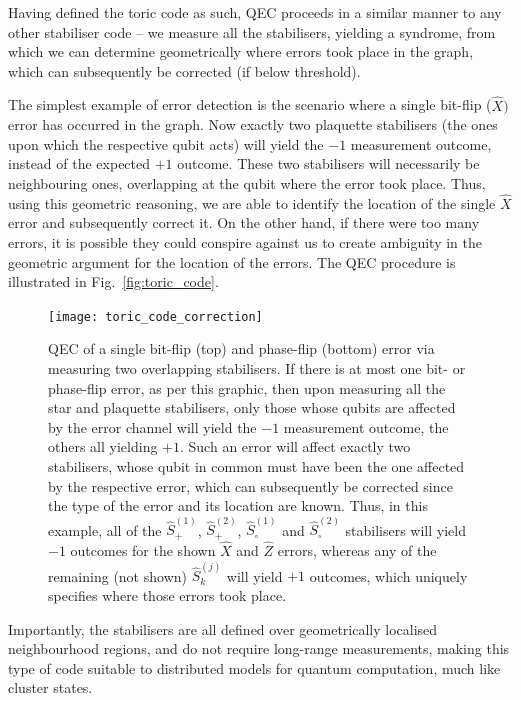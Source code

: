 Having defined the toric code as such, QEC proceeds in a similar manner to any other stabiliser code -- we measure all the stabilisers, yielding a syndrome, from which we can determine geometrically where errors took place in the graph, which can subsequently be corrected (if below threshold).

The simplest example of error detection is the scenario where a single bit-flip ($\hat{X})$ error has occurred in the graph. Now exactly two plaquette stabilisers (the ones upon which the respective qubit acts) will yield the $-1$ measurement outcome, instead of the expected $+1$ outcome. These two stabilisers will necessarily be neighbouring ones, overlapping at the qubit where the error took place. Thus, using this geometric reasoning, we are able to identify the location of the single $\hat{X}$ error and subsequently correct it. On the other hand, if there were too many errors, it is possible they could conspire against us to create ambiguity in the geometric argument for the location of the errors. The QEC procedure is illustrated in Fig.~\ref{fig:toric_code}.

\begin{figure}[!htbp]
	\texttt{[image: toric\_code\_correction]}
	\captionspacefig \caption{QEC of a single bit-flip (top) and phase-flip (bottom) error via measuring two overlapping stabilisers. If there is at most one bit- or phase-flip error, as per this graphic, then upon measuring all the star and plaquette stabilisers, only those whose qubits are affected by the error channel will yield the $-1$ measurement outcome, the others all yielding $+1$. Such an error will affect exactly two stabilisers, whose qubit in common must have been the one affected by the respective error, which can subsequently be corrected since the type of the error and its location are known. Thus, in this example, all of the $\hat{S}_+^{(1)}$, $\hat{S}_+^{(2)}$, $\hat{S}_\square^{(1)}$ and $\hat{S}_\square^{(2)}$ stabilisers will yield $-1$ outcomes for the shown $\hat{X}$ and $\hat{Z}$ errors, whereas any of the remaining (not shown) $\hat{S}_k^{(j)}$ will yield $+1$ outcomes, which uniquely specifies where those errors took place.}\label{fig:toric_corr}	
\end{figure}

Importantly, the stabilisers are all defined over geometrically localised neighbourhood regions, and do not require long-range measurements, making this type of code suitable to distributed models for quantum computation, much like cluster states.

